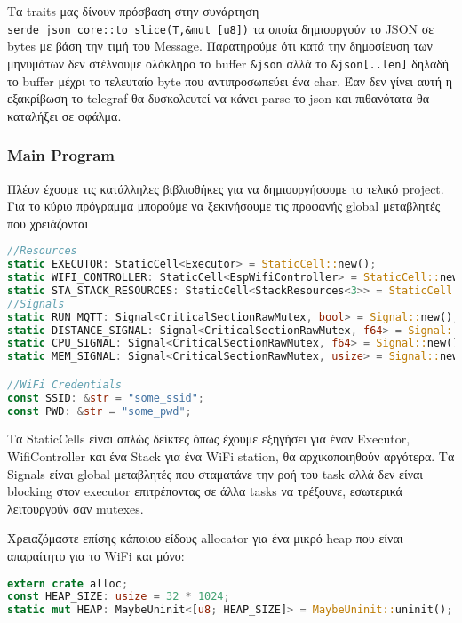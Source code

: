 Τα traits μας δίνουν πρόσβαση στην συνάρτηση \verb|serde_json_core::to_slice(T,&mut [u8])|
τα οποία δημιουργούν το JSON σε bytes με βάση την τιμή του Message. Παρατηρούμε ότι κατά
την δημοσίευση των μηνυμάτων δεν στέλνουμε ολόκληρο το buffer \verb|&json| αλλά το
\verb|&json[..len]| δηλαδή το buffer μέχρι το τελευταίο byte που αντιπροσωπεύει ένα
char. Έαν δεν γίνει αυτή η εξακρίβωση το telegraf θα δυσκολευτεί να κάνει parse το
json και πιθανότατα θα καταλήξει σε σφάλμα.

\subsubsection{Main Program}

Πλέον έχουμε τις κατάλληλες βιβλιοθήκες για να δημιουργήσουμε το
τελικό project. Για το κύριο πρόγραμμα μπορούμε να ξεκινήσουμε τις
προφανής global μεταβλητές που χρειάζονται

\begin{lstlisting}[language=Rust]
//Resources
static EXECUTOR: StaticCell<Executor> = StaticCell::new();
static WIFI_CONTROLLER: StaticCell<EspWifiController> = StaticCell::new();
static STA_STACK_RESOURCES: StaticCell<StackResources<3>> = StaticCell::new();
//Signals
static RUN_MQTT: Signal<CriticalSectionRawMutex, bool> = Signal::new();
static DISTANCE_SIGNAL: Signal<CriticalSectionRawMutex, f64> = Signal::new();
static CPU_SIGNAL: Signal<CriticalSectionRawMutex, f64> = Signal::new();
static MEM_SIGNAL: Signal<CriticalSectionRawMutex, usize> = Signal::new();

//WiFi Credentials
const SSID: &str = "some_ssid";
const PWD: &str = "some_pwd";
\end{lstlisting}

Τα StaticCells είναι απλώς δείκτες όπως έχουμε εξηγήσει για έναν Executor, WifiController και
ένα Stack για ένα WiFi station, θα αρχικοποιηθούν αργότερα. Τα Signals είναι global μεταβλητές
που σταματάνε την ροή του task αλλά δεν είναι blocking στον executor επιτρέποντας σε άλλα tasks
να τρέξουνε, εσωτερικά λειτουργούν σαν mutexes.

Χρειαζόμαστε επίσης κάποιου είδους allocator για ένα μικρό heap που είναι απαραίτητο για το WiFi και μόνο:

\begin{lstlisting}[language=Rust]
extern crate alloc;
const HEAP_SIZE: usize = 32 * 1024;
static mut HEAP: MaybeUninit<[u8; HEAP_SIZE]> = MaybeUninit::uninit();
\end{lstlisting}

